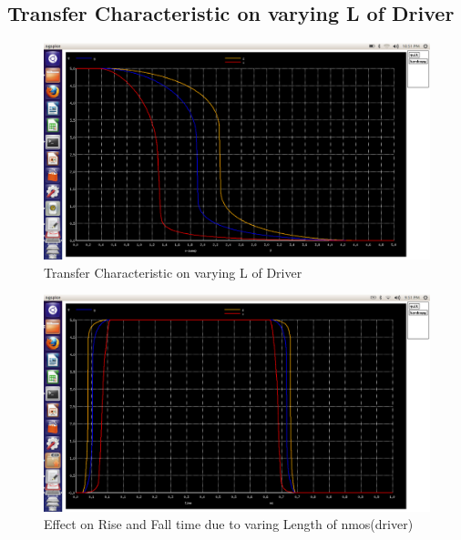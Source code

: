 \documentclass[12pt,a4paper]{article}
\begin{document}
\begin{center}
 \clearpage
 \subsection{Transfer Characteristic on varying L of Driver}
 \begin{figure}[!ht]
 \centering
 \includegraphics[scale=0.37]{lab5_3_pic2_tansfer_char_varing_Lof_drivernmos.png}
 
 \caption[Short]{Transfer Characteristic on varying L of Driver}
 \end{figure}


 
 \begin{figure}[!ht]
 \centering
 \includegraphics[scale=0.37]{lab5_3_pic3.png}
 \caption[Short]{Effect on Rise and Fall time due to varing Length of nmos(driver)}
 \end{figure}
 \clearpage

\end{center}
\end{document}
